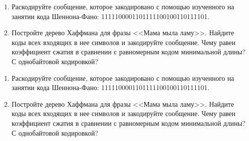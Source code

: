 \documentclass[12pt]{article}
\begin{document}
\begin{enumerate}
\item Раскодируйте сообщение, которое закодировано с помощью изученного на занятии кода Шеннона-Фано: 1111100001101111100100110111101.
\item Постройте дерево Хаффмана для фразы <<Мама мыла ламу>>. Найдите коды всех входящих в нее символов и закодируйте сообщение. Чему равен коэффициент сжатия в сравнении с равномерным кодом минимальной длины? С однобайтовой кодировкой?
\end{enumerate}

\begin{enumerate}
\item Раскодируйте сообщение, которое закодировано с помощью изученного на занятии кода Шеннона-Фано: 1111100001101111100100110111101.
\item Постройте дерево Хаффмана для фразы <<Мама мыла ламу>>. Найдите коды всех входящих в нее символов и закодируйте сообщение. Чему равен коэффициент сжатия в сравнении с равномерным кодом минимальной длины? С однобайтовой кодировкой?
\end{enumerate}
\end{document}
